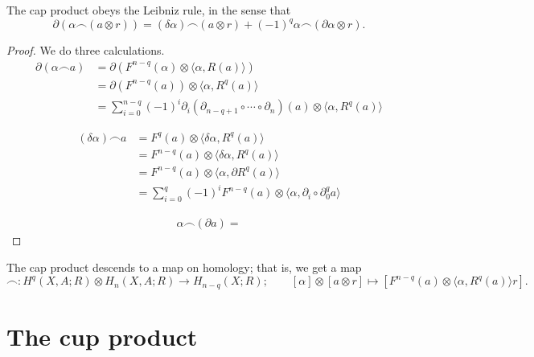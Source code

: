 \documentclass[main.tex]{subfiles}
\begin{document}
\begin{lemma}
  \label{lemma:cap_product_leibniz_rule}
  The cap product obeys the Leibniz rule, in the sense that
  \begin{equation*}
    \partial(\alpha \frown (a \otimes r)) = (\delta \alpha) \frown (a \otimes r) + (-1)^{q} \alpha \frown (\partial \alpha \otimes r).
  \end{equation*}
\end{lemma}
\begin{proof}
  We do three calculations.
  \begin{align*}
    \partial( \alpha \frown a ) &= \partial(F^{n-q}(\alpha) \otimes \langle \alpha, R(a) \rangle) \\
    &= \partial(F^{n-q}(a)) \otimes \langle \alpha, R^{q}(a) \rangle \\
    &= \sum_{i = 0}^{n-q} (-1)^{i} \partial_{i} (\partial_{n-q+1} \circ \cdots \circ \partial_{n})(a) \otimes\langle \alpha, R^{q}(a) \rangle
  \end{align*}

  \begin{align*}
    (\delta \alpha) \frown a &= F^{q}(a) \otimes \langle \delta \alpha, R^{q}(a) \rangle \\
    &= F^{n-q}(a) \otimes \langle \delta \alpha, R^{q}(a) \rangle \\
    &= F^{n-q}(a) \otimes \langle \alpha, \partial R^{q}(a) \rangle \\
    &= \sum_{i = 0}^{q} (-1)^{i} F^{n-q}(a) \otimes \langle \alpha, \partial_{i} \circ \partial_{0}^{q} a \rangle
  \end{align*}

  \begin{align*}
    \alpha \frown (\partial a) =
  \end{align*}
\end{proof}

\begin{proposition}
  The cap product descends to a map on homology; that is, we get a map
  \begin{equation*}
    \frown\colon H^{q}(X, A; R) \otimes H_{n}(X, A; R) \to H_{n-q}(X; R); \qquad [\alpha] \otimes [a \otimes r] \mapsto [F^{n-q}(a) \otimes \langle \alpha, R^{q}(a) \rangle r].
  \end{equation*}
\end{proposition}

\section{The cup product}
\label{sec:the_cup_product}
\end{document}
